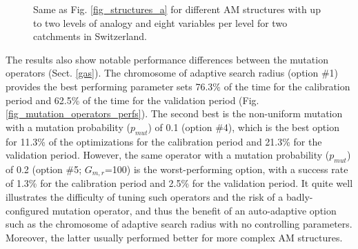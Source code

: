 \documentclass[draft]{agujournal2019}
\begin{document}
\begin{figure}[hbt]
	\noindent{}
	\caption{Same as Fig. \ref{fig_structures_a} for different AM structures with up to two levels of analogy and eight variables per level for two catchments in Switzerland.}
	\label{fig_structures_b}
\end{figure}

The results also show notable performance differences between the mutation operators (Sect. \ref{gas}). The chromosome of adaptive search radius (option \#1) provides the best performing parameter sets 76.3\% of the time for the calibration period and 62.5\% of the time for the validation period (Fig. \ref{fig_mutation_operators_perfs}). The second best is the non-uniform mutation with a mutation probability ($p_{mut}$) of 0.1 (option \#4), which is the best option for 11.3\% of the optimizations for the calibration period and 21.3\% for the validation period. However, the same operator with a mutation probability ($p_{mut}$) of 0.2 (option \#5; $G_{m,r}$=100) is the worst-performing option, with a success rate of 1.3\% for the calibration period and 2.5\% for the validation period. It quite well illustrates the difficulty of tuning such operators and the risk of a badly-configured mutation operator, and thus the benefit of an auto-adaptive option such as the chromosome of adaptive search radius with no controlling parameters. Moreover, the latter usually performed better for more complex AM structures.
\end{document}
